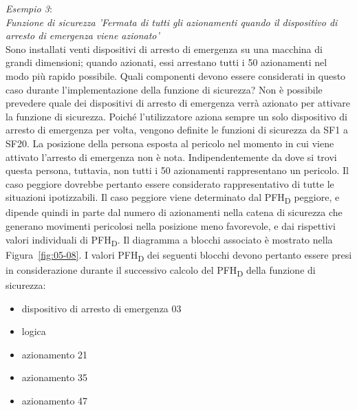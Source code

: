 \textit{Esempio 3}:\\
\textit{Funzione di sicurezza 'Fermata di tutti gli azionamenti quando il dispositivo di arresto di emergenza viene azionato'}\\ 
Sono installati venti dispositivi di arresto di emergenza su una macchina di grandi dimensioni; quando azionati, essi arrestano tutti i 50 azionamenti nel modo più rapido possibile. Quali componenti devono essere considerati in questo caso durante l'implementazione della funzione di sicurezza? Non è possibile prevedere quale dei dispositivi di arresto di emergenza verrà azionato per attivare la funzione di sicurezza. Poiché l'utilizzatore aziona sempre un solo dispositivo di arresto di emergenza per volta, vengono definite le funzioni di sicurezza da SF1 a SF20. La posizione della persona esposta al pericolo nel momento in cui viene attivato l'arresto di emergenza non è nota. Indipendentemente da dove si trovi questa persona, tuttavia, non tutti i 50 azionamenti rappresentano un pericolo. Il caso peggiore dovrebbe pertanto essere considerato rappresentativo di tutte le situazioni ipotizzabili. Il caso peggiore viene determinato dal PFH\textsubscript{D} peggiore, e dipende quindi in parte dal numero di azionamenti nella catena di sicurezza che generano movimenti pericolosi nella posizione meno favorevole, e dai rispettivi valori individuali di PFH\textsubscript{D}\@. Il diagramma a blocchi associato è mostrato nella Figura~\ref{fig:05-08}. I valori PFH\textsubscript{D} dei seguenti blocchi devono pertanto essere presi in considerazione durante il successivo calcolo del PFH\textsubscript{D} della funzione di sicurezza:
\begin{itemize}
	\item dispositivo di arresto di emergenza 03
	\item logica
	\item azionamento 21
	\item azionamento 35
	\item azionamento 47
\end{itemize}

\begin{center}
    \begin{minipage}{\textwidth}
        \centering
        \captionsetup{hypcap=false}
        \resizebox{0.92\textwidth}{!}{}
        \label{fig:05-08}
    \end{minipage}
\end{center}


